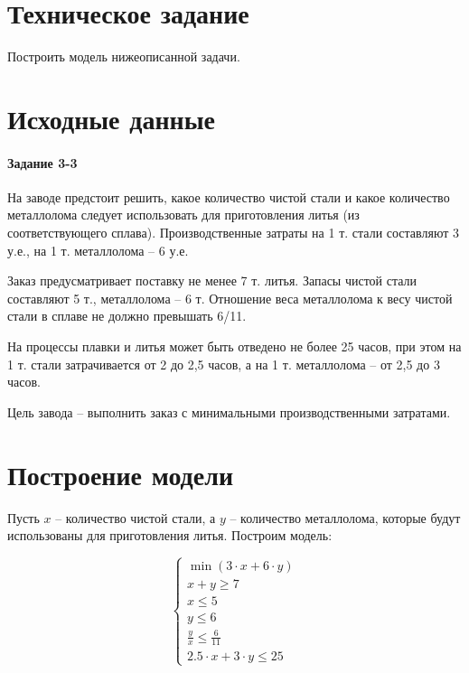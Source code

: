 





\section{Техническое задание}

Построить модель нижеописанной задачи.

\section{Исходные данные}

\paragraph{Задание 3-3}

На заводе предстоит решить, какое количество чистой стали и какое количество металлолома следует использовать для приготовления литья (из соответствующего сплава). Производственные затраты на 1 т. стали составляют 3 у.е., на 1 т. металлолома -- 6 у.е. 

Заказ предусматривает поставку не менее 7 т. литья. Запасы чистой стали составляют 5 т., металлолома – 6 т. Отношение веса металлолома к весу чистой стали в сплаве не должно превышать 6/11.

На процессы плавки и литья может быть отведено не более 25 часов, при этом на
1 т. стали затрачивается от 2 до 2,5 часов, а на 1 т. металлолома – от 2,5 до 3 часов.

Цель завода -- выполнить заказ с минимальными производственными затратами. 

\section{Построение модели}

Пусть $x$ -- количество чистой стали, а $y$ -- количество металлолома, которые будут использованы для приготовления литья. Построим модель: 

\begin{equation*}
\begin{cases} 
\min(3 \cdot x + 6 \cdot y) \\
x + y \ge 7 \\ 
x \le 5 \\ 
y \le 6 \\
\frac{y}{x} \le \frac{6}{11} \\
2.5 \cdot x + 3 \cdot y \le 25
\end{cases}
\end{equation*}

